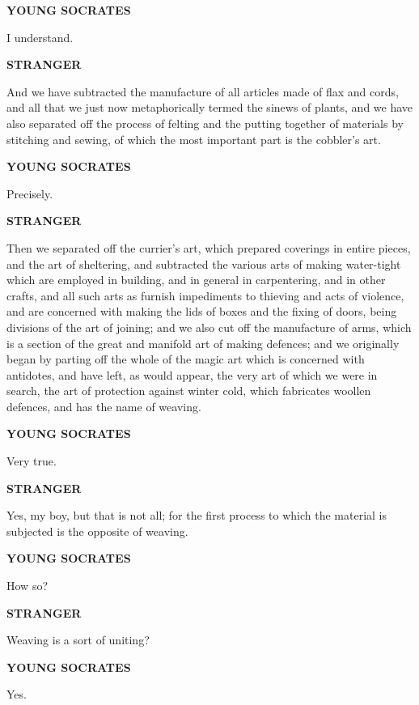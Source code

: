 \documentclass[11pt,letter]{article}
\begin{document}
\par \textbf{YOUNG SOCRATES}
\par   I understand.

\par \textbf{STRANGER}
\par   And we have subtracted the manufacture of all articles made of flax and cords, and all that we just now metaphorically termed the sinews of plants, and we have also separated off the process of felting and the putting together of materials by stitching and sewing, of which the most important part is the cobbler's art.

\par \textbf{YOUNG SOCRATES}
\par   Precisely.

\par \textbf{STRANGER}
\par   Then we separated off the currier's art, which prepared coverings in entire pieces, and the art of sheltering, and subtracted the various arts of making water-tight which are employed in building, and in general in carpentering, and in other crafts, and all such arts as furnish impediments to thieving and acts of violence, and are concerned with making the lids of boxes and the fixing of doors, being divisions of the art of joining; and we also cut off the manufacture of arms, which is a section of the great and manifold art of making defences; and we originally began by parting off the whole of the magic art which is concerned with antidotes, and have left, as would appear, the very art of which we were in search, the art of protection against winter cold, which fabricates woollen defences, and has the name of weaving.

\par \textbf{YOUNG SOCRATES}
\par   Very true.

\par \textbf{STRANGER}
\par   Yes, my boy, but that is not all; for the first process to which the material is subjected is the opposite of weaving.

\par \textbf{YOUNG SOCRATES}
\par   How so?

\par \textbf{STRANGER}
\par   Weaving is a sort of uniting?

\par \textbf{YOUNG SOCRATES}
\par   Yes.
\end{document}
